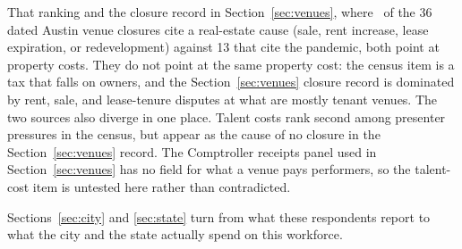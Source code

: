 That ranking and the closure record in Section~\ref{sec:venues}, where
\NCensusClosuresPropertyShare\ of the 36 dated Austin venue closures cite a
real-estate cause (sale, rent increase, lease expiration, or redevelopment)
against 13 that cite the pandemic, both point at property costs. They do not
point at the same property cost: the census item is a tax that falls on
owners, and the Section~\ref{sec:venues} closure record is dominated by
rent, sale, and lease-tenure disputes at what are mostly tenant venues. The
two sources also diverge in one place. Talent costs rank second among
presenter pressures in the census, but appear as the cause of no closure in
the Section~\ref{sec:venues} record. The Comptroller receipts panel used in
Section~\ref{sec:venues} has no field for what a venue pays performers, so
the talent-cost item is untested here rather than contradicted.

Sections~\ref{sec:city} and \ref{sec:state} turn from what these respondents
report to what the city and the state actually spend on this workforce.
